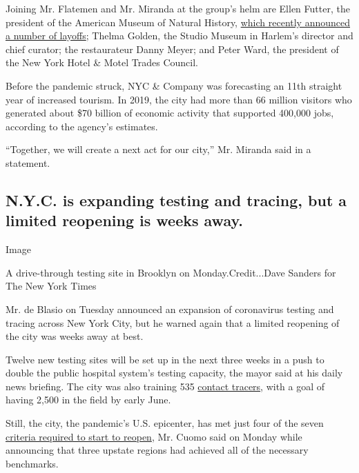 Joining Mr. Flatemen and Mr. Miranda at the group's helm are Ellen
Futter, the president of the American Museum of Natural History,
\href{https://www.nytimes3xbfgragh.onion/2020/05/06/arts/design/natural-history-layoffs-virus.html}{which
recently announced a number of layoffs}; Thelma Golden, the Studio
Museum in Harlem's director and chief curator; the restaurateur Danny
Meyer; and Peter Ward, the president of the New York Hotel \& Motel
Trades Council.

Before the pandemic struck, NYC \& Company was forecasting an 11th
straight year of increased tourism. In 2019, the city had more than 66
million visitors who generated about \$70 billion of economic activity
that supported 400,000 jobs, according to the agency's estimates.

``Together, we will create a next act for our city,'' Mr. Miranda said
in a statement.

\hypertarget{nyc-is-expanding-testing-and-tracing-but-a-limited-reopening-is-weeks-away}{%
\subsection{N.Y.C. is expanding testing and tracing, but a limited
reopening is weeks
away.}\label{nyc-is-expanding-testing-and-tracing-but-a-limited-reopening-is-weeks-away}}

Image

A drive-through testing site in Brooklyn on Monday.Credit...Dave Sanders
for The New York Times

Mr. de Blasio on Tuesday announced an expansion of coronavirus testing
and tracing across New York City, but he warned again that a limited
reopening of the city was weeks away at best.

Twelve new testing sites will be set up in the next three weeks in a
push to double the public hospital system's testing capacity, the mayor
said at his daily news briefing. The city was also training 535
\href{https://www.nytimes3xbfgragh.onion/2020/05/07/nyregion/coronavirus-contact-tracing-nyc.html}{contact
tracers}, with a goal of having 2,500 in the field by early June.

Still, the city, the pandemic's U.S. epicenter, has met just four of the
seven
\href{https://www.nytimes3xbfgragh.onion/2020/05/04/nyregion/coronavirus-reopen-cuomo-ny.html}{criteria
required to start to reopen}, Mr. Cuomo said on Monday while announcing
that three upstate regions had achieved all of the necessary benchmarks.

